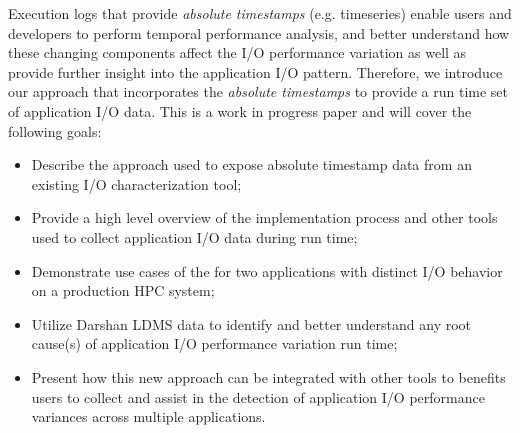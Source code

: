 
Execution logs that provide \emph{absolute timestamps}
(e.g. timeseries) enable users and developers to perform temporal
performance analysis, and better understand how these changing
components affect the I/O performance variation as well as provide
further insight into the application I/O pattern. Therefore, we
introduce our \Darshan{} approach that incorporates the \emph{absolute
  timestamps} to provide a run time set of application I/O data. This
is a work in progress paper and will cover the following goals:

\begin{itemize}
	\item Describe the approach used to expose absolute timestamp
          data from an existing I/O characterization tool;
       	\item Provide a high level overview of the implementation
          process and other tools used to collect application I/O data
          during run time;
  	\item Demonstrate use cases of the \connector{} for two
          applications with distinct I/O behavior on a production HPC
          system;
        \item Utilize Darshan LDMS data to identify and better
          understand any root cause(s) of application I/O performance
          variation run time;
	\item Present how this new approach can be integrated with
          other tools to benefits users to collect and assist in the
          detection of application I/O performance variances across
          multiple applications.
\end{itemize}

